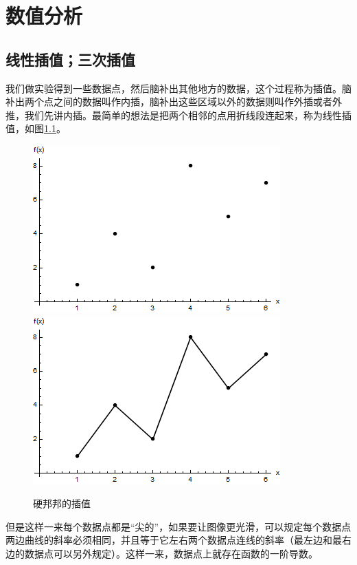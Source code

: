 \chapter{数值分析}
\section{线性插值；三次插值}
我们做实验得到一些数据点，然后脑补出其他地方的数据，这个过程称为插值。脑补出两个点之间的数据叫作内插，脑补出这些区域以外的数据则叫作外插或者外推，我们先讲内插。最简单的想法是把两个相邻的点用折线段连起来，称为线性插值，如图\ref{fig-disc-data}。
\begin{figure}[htb]
\centering
\includegraphics[scale=0.5]{fig/disc-data}
\includegraphics[scale=0.5]{fig/disc-data-line}
\caption{硬邦邦的插值}
\label{fig-disc-data}
\end{figure}

但是这样一来每个数据点都是“尖的”，如果要让图像更光滑，可以规定每个数据点两边曲线的斜率必须相同，并且等于它左右两个数据点连线的斜率（最左边和最右边的数据点可以另外规定）。这样一来，数据点上就存在函数的一阶导数。

